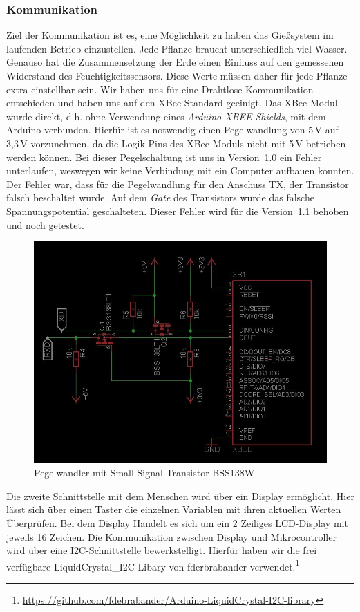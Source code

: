 \documentclass[]{IEEEtran}
\begin{document}
\subsubsection{Kommunikation}
Ziel der Kommunikation ist es, eine Möglichkeit zu haben das Gießsystem im laufenden Betrieb einzustellen. 
Jede Pflanze braucht unterschiedlich viel Wasser. 
Genauso hat die Zusammensetzung der Erde einen Einfluss auf den gemessenen Widerstand des Feuchtigkeitssensors. 
Diese Werte müssen daher für jede Pflanze extra einstellbar sein. 
Wir haben uns für eine Drahtlose Kommunikation entschieden und haben uns auf den XBee Standard geeinigt. 
Das XBee Modul wurde direkt, d.h. ohne Verwendung eines \emph{Arduino XBEE-Shields}, mit dem Arduino verbunden. 
Hierfür ist es notwendig einen Pegelwandlung von 5\,V auf 3,3\,V vorzunehmen, da die Logik-Pins des XBee Moduls nicht mit 5\,V betrieben werden können. 
Bei dieser Pegelschaltung ist uns in Version~1.0 ein Fehler unterlaufen, weswegen wir keine Verbindung mit ein Computer aufbauen konnten. 
Der Fehler war, dass für die Pegelwandlung für den Anschuss TX, der Transistor falsch beschaltet wurde. 
Auf dem \emph{Gate} des Transistors wurde das falsche Spannungspotential geschalteten. 
Dieser Fehler wird für die Version~1.1 behoben und noch getestet.

\begin{figure}
	\centering
	\includegraphics[width=0.8\linewidth]{bilder/v1SchaltplanXbee.jpg}
	\caption{Pegelwandler mit Small-Signal-Transistor BSS138W }
	\label{fig-Pegel}
\end{figure}
		
Die zweite Schnittstelle mit dem Menschen wird über ein Display ermöglicht. 
Hier lässt sich über einen Taster die einzelnen Variablen mit ihren aktuellen Werten Überprüfen. 
Bei dem Display Handelt es sich um ein 2 Zeiliges LCD-Display mit jeweils 16 Zeichen. 
Die Kommunikation zwischen Display und Mikrocontroller wird über eine I2C-Schnittstelle bewerkstelligt. 
Hierfür haben wir die frei verfügbare LiquidCrystal\_I2C Libary von fderbrabander verwendet.\footnote{\href{https://github.com/fdebrabander/Arduino-LiquidCrystal-I2C-library}{https://github.com/fdebrabander/Arduino-LiquidCrystal-I2C-library}}
	
\end{document}
